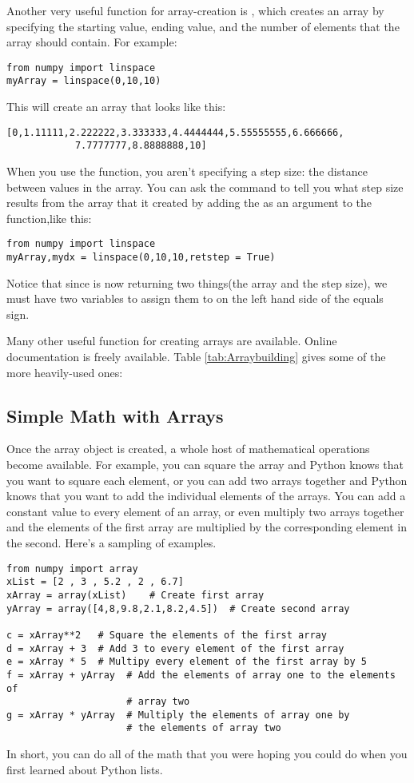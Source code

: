 Another very useful function for array-creation is ,
which creates an array by specifying the starting value, ending value,
and the number of elements that the array should contain.  For example:
\begin{Verbatim}
from numpy import linspace
myArray = linspace(0,10,10)
\end{Verbatim}
This will create an array that looks like this:
\begin{Verbatim}
[0,1.11111,2.222222,3.333333,4.4444444,5.55555555,6.666666,
            7.7777777,8.8888888,10]
\end{Verbatim}
When you use the  function, you aren't specifying a
step size: the distance between values in the array.  You can ask the
 command to tell you what step size results from the
array that it created by adding the  as an
argument to the function,like this:
\begin{Verbatim}
from numpy import linspace
myArray,mydx = linspace(0,10,10,retstep = True)
\end{Verbatim}
Notice that since  is now returning two things(the
array and the step size), we must have two variables to assign them to
on the left hand side of the equals sign.

Many other useful function for creating arrays are available.  Online
documentation is freely available.  Table \ref{tab:Arraybuilding}
gives some of the more heavily-used ones:

\subsection*{Simple Math with Arrays}
Once the array object is created, a whole host of mathematical
operations become available.  For example, you can square the array
and Python knows that you want to square each element, or you can add
two arrays together and Python knows that you want to add the
individual elements of the arrays.  You can add a constant value to
every element of an array, or even multiply two arrays together and
the elements of the first array are multiplied by the corresponding
element in the second.  Here's a sampling of examples.
\begin{Verbatim}
from numpy import array
xList = [2 , 3 , 5.2 , 2 , 6.7]
xArray = array(xList)    # Create first array
yArray = array([4,8,9.8,2.1,8.2,4.5])  # Create second array

c = xArray**2   # Square the elements of the first array
d = xArray + 3  # Add 3 to every element of the first array
e = xArray * 5  # Multipy every element of the first array by 5
f = xArray + yArray  # Add the elements of array one to the elements of
                     # array two
g = xArray * yArray  # Multiply the elements of array one by
                     # the elements of array two

\end{Verbatim}
In short, you can do all of the math that you were hoping you could do
when you first learned about Python lists.

